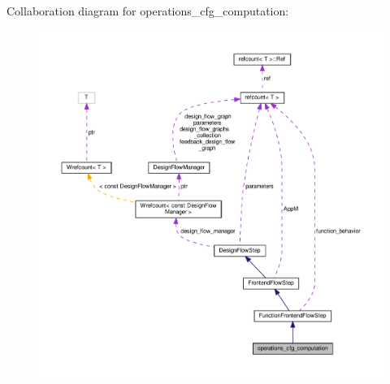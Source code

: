 Collaboration diagram for operations\+\_\+cfg\+\_\+computation\+:
\nopagebreak
\begin{figure}[H]
\begin{center}
\leavevmode
\includegraphics[width=350pt]{d6/d8c/classoperations__cfg__computation__coll__graph}
\end{center}
\end{figure}
